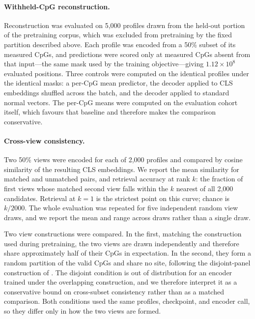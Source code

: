 \paragraph{Withheld-CpG reconstruction.}
Reconstruction was evaluated on 5,000 profiles drawn from the held-out portion of the
pretraining corpus, which was excluded from pretraining by the fixed partition described
above. Each profile was encoded from a 50\% subset of its measured CpGs, and predictions were
scored only at measured CpGs absent from that input---the same mask used by the training
objective---giving $1.12\times10^{8}$ evaluated positions. Three controls were computed on the
identical profiles under the identical masks: a per-CpG mean predictor, the decoder applied to
CLS embeddings shuffled across the batch, and the decoder applied to standard normal vectors.
The per-CpG means were computed on the evaluation cohort itself, which favours that baseline
and therefore makes the comparison conservative.

\paragraph{Cross-view consistency.}
Two 50\% views were encoded for each of 2,000 profiles and compared by cosine similarity of the
resulting CLS embeddings. We report the mean similarity for matched and unmatched pairs, and
retrieval accuracy at rank $k$: the fraction of first views whose matched second view falls
within the $k$ nearest of all 2,000 candidates. Retrieval at $k=1$ is the strictest point on
this curve; chance is $k/2000$. The whole evaluation was repeated for five independent random
view draws, and we report the mean and range across draws rather than a single draw.

Two view constructions were compared. In the first, matching the construction used during
pretraining, the two views are drawn independently and therefore share approximately half of
their CpGs in expectation. In the second, they form a random partition of the valid CpGs and
share no site, following the disjoint-panel construction of \citet{Bahrami2025}. The disjoint
condition is out of distribution for an encoder trained under the overlapping construction, and
we therefore interpret it as a conservative bound on cross-subset consistency rather than as a
matched comparison. Both conditions used the same profiles, checkpoint, and encoder call, so
they differ only in how the two views are formed.
